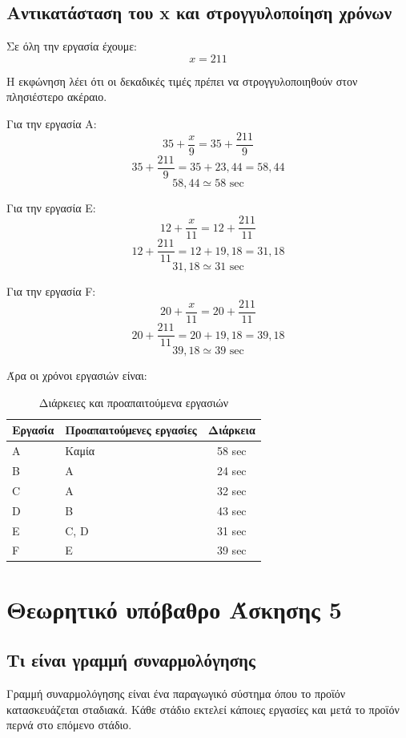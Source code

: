 \documentclass[12pt,a4paper]{article}
\begin{document}
\subsection{Αντικατάσταση του x και στρογγυλοποίηση χρόνων}

Σε όλη την εργασία έχουμε:
\[
x=211
\]

Η εκφώνηση λέει ότι οι δεκαδικές τιμές πρέπει να στρογγυλοποιηθούν στον πλησιέστερο ακέραιο.

Για την εργασία A:
\[
35+\frac{x}{9}=35+\frac{211}{9}
\]
\[
35+\frac{211}{9}=35+23{,}44=58{,}44
\]
\[
58{,}44 \simeq 58 \text{ sec}
\]

Για την εργασία E:
\[
12+\frac{x}{11}=12+\frac{211}{11}
\]
\[
12+\frac{211}{11}=12+19{,}18=31{,}18
\]
\[
31{,}18 \simeq 31 \text{ sec}
\]

Για την εργασία F:
\[
20+\frac{x}{11}=20+\frac{211}{11}
\]
\[
20+\frac{211}{11}=20+19{,}18=39{,}18
\]
\[
39{,}18 \simeq 39 \text{ sec}
\]

Άρα οι χρόνοι εργασιών είναι:

\begin{table}[H]
\centering
\caption{Διάρκειες και προαπαιτούμενα εργασιών}
\small
\begin{tabular}{llc}
\toprule
\textbf{Εργασία} & \textbf{Προαπαιτούμενες εργασίες} & \textbf{Διάρκεια} \\
\midrule
A & Καμία & 58 sec \\
B & A & 24 sec \\
C & A & 32 sec \\
D & B & 43 sec \\
E & C, D & 31 sec \\
F & E & 39 sec \\
\bottomrule
\end{tabular}
\end{table}

\section{Θεωρητικό υπόβαθρο Άσκησης 5}

\subsection{Τι είναι γραμμή συναρμολόγησης}

Γραμμή συναρμολόγησης είναι ένα παραγωγικό σύστημα όπου το προϊόν κατασκευάζεται σταδιακά. Κάθε στάδιο εκτελεί κάποιες εργασίες και μετά το προϊόν περνά στο επόμενο στάδιο.
\end{document}
